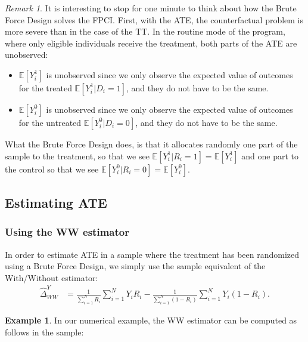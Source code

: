 \documentclass[
]{book}
\providecommand{\tightlist}{%
  \setlength{\itemsep}{0pt}\setlength{\parskip}{0pt}}
\newcommand{\esp}[1]{\mathbb{E}[ #1 ]}
\theoremstyle{definition}
\theoremstyle{definition}
\newtheorem{example}{Example}[chapter]
\theoremstyle{definition}
\theoremstyle{definition}
\theoremstyle{remark}
\newtheorem*{remark}{Remark}
\begin{document}
\begin{remark}
\iffalse{} {Remark. } \fi{}It is interesting to stop for one minute to think about how the Brute Force Design solves the FPCI.
First, with the ATE, the counterfactual problem is more severe than in the case of the TT.
In the routine mode of the program, where only eligible individuals receive the treatment, both parts of the ATE are unobserved:
\end{remark}

\begin{itemize}
\tightlist
\item
  \(\esp{Y_i^1}\) is unobserved since we only observe the expected value of outcomes for the treated \(\esp{Y_i^1|D_i=1}\), and they do not have to be the same.
\item
  \(\esp{Y_i^0}\) is unobserved since we only observe the expected value of outcomes for the untreated \(\esp{Y_i^0|D_i=0}\), and they do not have to be the same.
\end{itemize}

What the Brute Force Design does, is that it allocates randomly one part of the sample to the treatment, so that we see \(\esp{Y_i^1|R_i=1}=\esp{Y_i^1}\) and one part to the control so that we see \(\esp{Y_i^0|R_i=0}=\esp{Y_i^0}\).

\hypertarget{estimating-ate}{%
\subsection{Estimating ATE}\label{estimating-ate}}

\hypertarget{using-the-ww-estimator}{%
\subsubsection{Using the WW estimator}\label{using-the-ww-estimator}}

In order to estimate ATE in a sample where the treatment has been randomized using a Brute Force Design, we simply use the sample equivalent of the With/Without estimator:
\begin{align*}
  \hat{\Delta}^Y_{WW} & = \frac{1}{\sum_{i=1}^N R_i}\sum_{i=1}^N Y_iR_i-\frac{1}{\sum_{i=1}^N (1-R_i)}\sum_{i=1}^N Y_i(1-R_i).
\end{align*}

\begin{example}
\protect\hypertarget{exm:unnamed-chunk-70}{}{\label{exm:unnamed-chunk-70} }In our numerical example, the WW estimator can be computed as follows in the sample:
\end{example}
\end{document}
